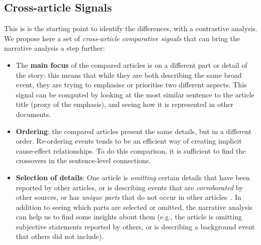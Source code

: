 \subsection{Cross-article Signals}
This is is the starting point to identify the differences, with a contrastive analysis. We propose here a set of \emph{cross-article comparative signals} that can bring the narrative analysis a step further:
\begin{itemize}
    \item The \textbf{main focus} of the compared articles is on a different part or detail of the story: this means that while they are both describing the same broad event, they are trying to emphasise or prioritise two different aspects.
    This signal can be computed by looking at the most similar sentence to the article title (proxy of the emphasis), and seeing how it is represented in other documents.
    
    \item \textbf{Ordering}: the compared articles present the same details, but in a different order.
    Re-ordering events tends to be an efficient way of creating implicit cause-effect relationships. 
    To do this comparison, it is sufficient to find the crossovers in the sentence-level connections.

    \item \textbf{Selection of details}:
    One article is \emph{omitting} certain details that have been reported by other articles, or is describing events that are \emph{corroborated} by other sources, or has \emph{unique parts} that do not occur in other articles~\cite{bountouridis2018explaining}.
    In addition to seeing which parts are selected or omitted, the narrative analysis can help us to find some insights about them (e.g., the article is omitting subjective statements reported by others, or is describing a background event that others did not include).
    

\end{itemize}
